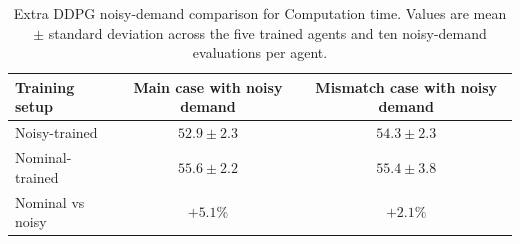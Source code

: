 \begin{table}[htbp]
\centering
\caption{Extra DDPG noisy-demand comparison for Computation time. Values are mean $\pm$ standard deviation across the five trained agents and ten noisy-demand evaluations per agent.}
\label{tab:extra_comp_time_comparison}
\begin{tabular}{lcc}
\toprule
Training setup & Main case with noisy demand & Mismatch case with noisy demand \\
\midrule
Noisy-trained & $52.9 \pm 2.3$ & $54.3 \pm 2.3$ \\
Nominal-trained & $55.6 \pm 2.2$ & $55.4 \pm 3.8$ \\
\midrule
Nominal vs noisy & $+5.1\%$ & $+2.1\%$ \\
\bottomrule
\end{tabular}
\end{table}
